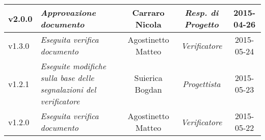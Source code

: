 \begin{table}[h]
\begin{tabular}{|p{}|p{}|c|c|c|}
	\midrule
		v2.0.0 & \textit{Approvazione documento} & Carraro Nicola & \textit{Resp. di Progetto} & 2015-04-26\\
	\midrule
		v1.3.0 & \textit{Eseguita verifica documento} & Agostinetto Matteo & \textit{Verificatore} & 2015-05-24\\
	\midrule
		v1.2.1 & \textit{Eseguite modifiche sulla base delle segnalazioni del verificatore} & Suierica Bogdan & \textit{Progettista} & 2015-05-23\\
	\midrule
		v1.2.0 & \textit{Eseguita verifica documento} & Agostinetto Matteo & \textit{Verificatore} & 2015-05-22\\
	\bottomrule
\end{tabular}	
\end{table}

\newpage

